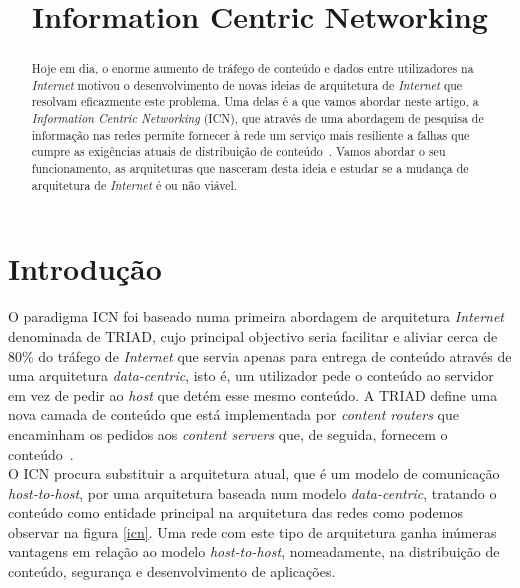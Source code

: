 \documentclass[conference]{IEEEtran}
\begin{document}
\title{Information Centric Networking}

\author{

}

\maketitle

\begin{abstract}
Hoje em dia, o enorme aumento de tr\'{a}fego de conte\'{u}do e dados entre utilizadores na \textit{Internet} motivou o desenvolvimento de novas ideias de arquitetura de \textit{Internet} que resolvam eficazmente este problema. Uma delas \'{e} a que vamos abordar neste artigo, a \textit{Information Centric Networking} (ICN), que atrav\'{e}s de uma abordagem de pesquisa de informa\c{c}\~{a}o nas redes permite fornecer \`{a} rede um servi\c{c}o mais resiliente a falhas que cumpre as exig\^{e}ncias atuais de distribui\c{c}\~{a}o de conte\'{u}do~\cite{ahlgren}. Vamos abordar o seu funcionamento, as arquiteturas que nasceram desta ideia e estudar se a mudan\c{c}a de arquitetura de \textit{Internet} \'{e} ou n\~{a}o vi\'{a}vel. 
\end{abstract}

\section{Introdu\c{c}\~{a}o}
O paradigma ICN foi baseado numa primeira abordagem de arquitetura \textit{Internet} denominada de TRIAD\cite{triad}, cujo principal objectivo seria facilitar e aliviar cerca de 80\% do tr\'{a}fego de \textit{Internet} que servia apenas para entrega de conte\'{u}do atrav\'{e}s de uma arquitetura \textit{data-centric}, isto \'{e}, um utilizador pede o conte\'{u}do ao servidor em vez de pedir ao \textit{host} que det\'{e}m esse mesmo conte\'{u}do\cite{ahlgren}. A TRIAD define uma nova camada de conte\'{u}do que est\'{a} implementada por \textit{content routers} que encaminham os pedidos aos \textit{content servers} que, de seguida, fornecem o conte\'{u}do~.\\

O ICN procura substituir a arquitetura atual, que \'{e} um modelo de comunica\c{c}\~{a}o \textit{host-to-host}, por uma arquitetura baseada num modelo \textit{data-centric}, tratando o conte\'{u}do como entidade principal na arquitetura das redes como podemos observar na figura \ref{icn}. Uma rede com este tipo de arquitetura ganha in\'{u}meras vantagens em rela\c{c}\~{a}o ao modelo \textit{host-to-host}, nomeadamente, na distribui\c{c}\~{a}o de conte\'{u}do, seguran\c{c}a e desenvolvimento de aplica\c{c}\~{o}es\cite{icn}.\\
\end{document}
